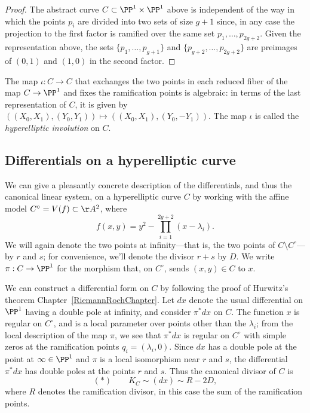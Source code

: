 \begin{proof}
The abstract curve $C\subset \PP^{1}\times \PP^{1}$ above
is independent of the way in which the points $p_{i}$ are divided
into two sets of size $g+1$ since, in any case the projection to the first factor 
is ramified over the same set $p_{1}, \dots, p_{2g+2}$. Given the representation above, the sets
$\{p_1, \dots,  p_{g+1}\}$ and  $\{p_{g+2}, \dots,  p_{2g+2}\}$ are preimages of $(0,1)$ and
$(1,0)$ in the second factor.
\end{proof}

 The map $\iota : C \to C$ that exchanges the two points in each reduced fiber of the map $C \to \PP^1$ and fixes the ramification points is algebraic: in terms of the last representation of $C$, it is given by $((X_0,X_1), (Y_0,Y_1)) \mapsto  ((X_0,X_1), (Y_0,-Y_1)) $. The map $\iota$ is called the \emph{hyperelliptic involution} on $C$.

  \subsection{Differentials on a hyperelliptic curve}\label{hyperelliptic differentials}

We can give a pleasantly concrete description of the differentials, and thus the canonical linear system, on a hyperelliptic curve $C$ by working with the affine model $C^\circ = V(f) \subset \AA^2$, where
$$
f(x,y) = y^2 - \prod_{i=1}^{2g+2} (x - \lambda_i).
$$
We will again denote the two points at infinity---that is, the two points of $C \setminus C^\circ$---by $r$ and $s$; for convenience, we'll denote the divisor $r+s$ by $D$. We write $\pi:C \to \PP^1$ for the morphism that, on $C^\circ$, sends $(x,y) \in C$ to $x$.

We can construct a differential form on $C$ by following the proof of
Hurwitz's theorem 
Chapter~\ref{RiemannRochChapter}.
Let $dx$ denote the usual differential on $\PP^1$ having a double pole at infinity, and consider $\pi^*dx$ on $C$.  The function $x$ is regular on $C^\circ$, and is a local parameter over points other than the $\lambda_i$; from the local description of the map $\pi$, we see that $\pi^*dx$ is regular on $C^\circ$  with simple zeros at the ramification points $q_i = (\lambda_i, 0)$. Since $dx$ has a double pole at the point at $\infty\in \PP^1$ and $\pi$ is a local isomorphism near $r$ and $s$, the differential $\pi^*dx$ has double poles at the points $r$ and $s$. Thus the canonical
divisor of $C$ is 
$$
(*) \qquad K_C \sim (dx) \sim R - 2D,
$$
where $R$ denotes the ramification divisor, in this case the sum of the ramification points. 

